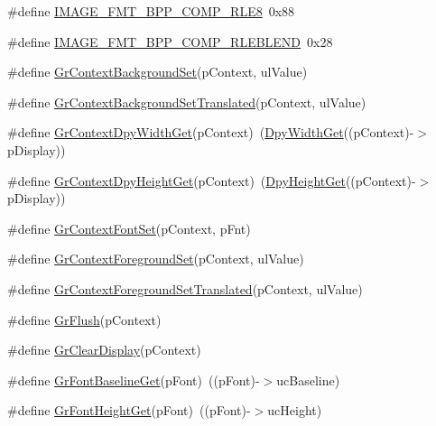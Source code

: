 \begin{DoxyCompactItemize}
\#define \hyperlink{group__primitives__api_ga474ba72ef6f424c3c378ed38a50e6bfa}{I\+M\+A\+G\+E\+\_\+\+F\+M\+T\+\_\+B\+P\+P\+\_\+\+C\+O\+M\+P\+\_\+\+R\+L\+E8}~0x88
\item 
\#define \hyperlink{group__primitives__api_ga3291de932ba18a02b1a92e2293f58809}{I\+M\+A\+G\+E\+\_\+\+F\+M\+T\+\_\+B\+P\+P\+\_\+\+C\+O\+M\+P\+\_\+\+R\+L\+E\+B\+L\+E\+N\+D}~0x28
\item 
\#define \hyperlink{group__primitives__api_gadcfe86bdefc0584e12d4ac9daf3d67e9}{Gr\+Context\+Background\+Set}(p\+Context,  ul\+Value)
\item 
\#define \hyperlink{group__primitives__api_gaf175706737ae73c86509ea2aef9106f9}{Gr\+Context\+Background\+Set\+Translated}(p\+Context,  ul\+Value)
\item 
\#define \hyperlink{group__primitives__api_ga1219ebc4661136115edbf5c5c6f24a44}{Gr\+Context\+Dpy\+Width\+Get}(p\+Context)~(\hyperlink{group__primitives__api_ga0a967ef53683123dc57ff3b6ed096289}{Dpy\+Width\+Get}((p\+Context)-\/$>$p\+Display))
\item 
\#define \hyperlink{group__primitives__api_gad4bd9f3f67afa6df74563bfed243a494}{Gr\+Context\+Dpy\+Height\+Get}(p\+Context)~(\hyperlink{group__primitives__api_ga541c63fcce8846a3f5cdb2d125f437d5}{Dpy\+Height\+Get}((p\+Context)-\/$>$p\+Display))
\item 
\#define \hyperlink{group__primitives__api_gadb0ccdf8e4d23475a4da5b218009edf3}{Gr\+Context\+Font\+Set}(p\+Context,  p\+Fnt)
\item 
\#define \hyperlink{group__primitives__api_ga0f2c64b797d0d085e39eb81a1b8f051c}{Gr\+Context\+Foreground\+Set}(p\+Context,  ul\+Value)
\item 
\#define \hyperlink{group__primitives__api_ga1de81823ccd63e4b3b9fe9087fba8bad}{Gr\+Context\+Foreground\+Set\+Translated}(p\+Context,  ul\+Value)
\item 
\#define \hyperlink{group__primitives__api_ga7be821658be3466ae9aad2176d5d28bf}{Gr\+Flush}(p\+Context)
\item 
\#define \hyperlink{group__primitives__api_gaa7d8c930f467174862c62ea7d7965389}{Gr\+Clear\+Display}(p\+Context)
\item 
\#define \hyperlink{group__primitives__api_gac2b082feb5f30948dbbc06edabc5cdcf}{Gr\+Font\+Baseline\+Get}(p\+Font)~((p\+Font)-\/$>$uc\+Baseline)
\item 
\#define \hyperlink{group__primitives__api_gabf5ee1d9a55f4b4e5afea07eb0a160b0}{Gr\+Font\+Height\+Get}(p\+Font)~((p\+Font)-\/$>$uc\+Height)
\item 

\end{DoxyCompactItemize}
